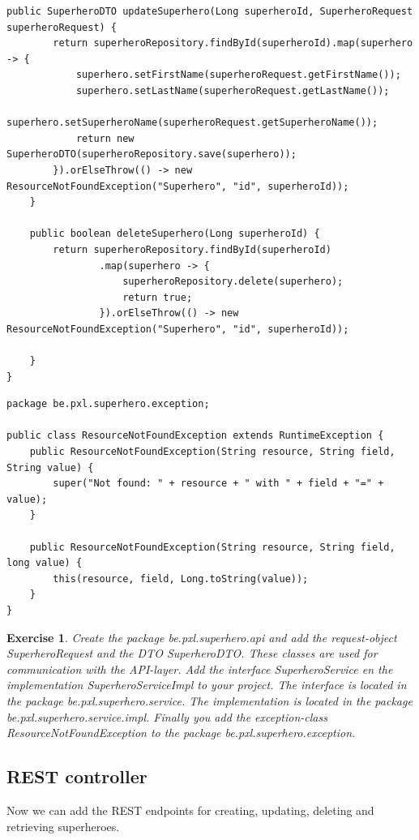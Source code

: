 \documentclass[a4paper, 12pt]{report}
\newenvironment{boxexercise}
{\begin{tcolorbox}
[enhanced jigsaw,breakable,pad at break*=1mm,
 colback=tsyellow!20,boxrule=0pt,frame hidden]}
{\end{tcolorbox}}
\newtheorem{envoefening}{\textbf{Exercise}}[chapter]
\newenvironment{oefening}
               {\begin{boxexercise}\begin{envoefening}}
               {\end{envoefening}\end{boxexercise}}
\begin{document}
\begin{lstlisting}[frame=single]
	public SuperheroDTO updateSuperhero(Long superheroId, SuperheroRequest superheroRequest) {
		return superheroRepository.findById(superheroId).map(superhero -> {
			superhero.setFirstName(superheroRequest.getFirstName());
			superhero.setLastName(superheroRequest.getLastName());
			superhero.setSuperheroName(superheroRequest.getSuperheroName());
			return new SuperheroDTO(superheroRepository.save(superhero));
		}).orElseThrow(() -> new ResourceNotFoundException("Superhero", "id", superheroId));
	}

	public boolean deleteSuperhero(Long superheroId) {
		return superheroRepository.findById(superheroId)
				.map(superhero -> {
					superheroRepository.delete(superhero);
					return true;
				}).orElseThrow(() -> new ResourceNotFoundException("Superhero", "id", superheroId));

	}
}
\end{lstlisting}

\begin{lstlisting}
package be.pxl.superhero.exception;

public class ResourceNotFoundException extends RuntimeException {
    public ResourceNotFoundException(String resource, String field, String value) {
        super("Not found: " + resource + " with " + field + "=" + value);
    }

    public ResourceNotFoundException(String resource, String field, long value) {
        this(resource, field, Long.toString(value));
    }
}
\end{lstlisting}

\begin{oefening}
Create the package \textit{be.pxl.superhero.api} and add the request-object SuperheroRequest and the DTO SuperheroDTO.  These classes are used for communication with the API-layer. 
Add the interface SuperheroService en the implementation SuperheroServiceImpl to your project. The interface is located in the package \textit{be.pxl.superhero.service}. The implementation is located in the package \textit{be.pxl.superhero.service.impl}. Finally you add the exception-class  ResourceNotFoundException to the package \textit{be.pxl.superhero.exception}.
\end{oefening}

\subsection{REST controller}

Now we can add the REST endpoints for creating, updating, deleting and retrieving superheroes. 
\end{document}
